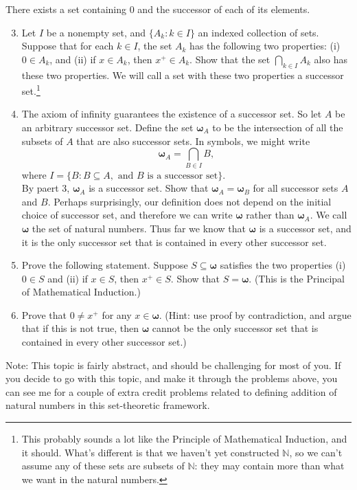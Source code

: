 \documentclass[letterpaper,12pt]{article}
\theoremstyle{definition}
\newcommand{\bomega}{\boldsymbol{\omega}}
\begin{document}
 There exists a set containing 0 and the successor of each of its elements.
\begin{enumerate}\setcounter{enumi}{2}
 \item Let $I$ be a nonempty set, and $\{A_k : k\in I\}$ an indexed collection of sets. Suppose that for each $k\in I$, the set $A_k$ has the following two properties: (i) $0\in A_k$, and (ii) if $x\in A_k$, then $x^+\in A_k$. Show that the set $\bigcap_{k\in I}A_k$ also has these two properties. We will call a set with these two properties a successor set.\footnote{This probably sounds a lot like the Principle of Mathematical Induction, and it should. What's different is that we haven't yet constructed $\mathbb{N}$, so we can't assume any of these sets are subsets of $\mathbb{N}$: they may contain more than what we want in the natural numbers.}
 \item The axiom of infinity guarantees the existence of a successor set. So let $A$ be an arbitrary successor set. Define the set $\bomega_A$ to be the intersection of all the subsets of $A$ that are also successor sets. In symbols, we might write
\[
 \bomega_A = \bigcap_{B\in I}B,
\]
where $I=\{B : B\subseteq A, \text{ and } B \text{ is a successor set}\}$.\\
By paert 3, $\bomega_A$ is a successor set. Show that $\bomega_A=\bomega_B$ for all successor sets $A$ and $B$. Perhaps surprisingly, our definition does not depend on the initial choice of successor set, and therefore we can write $\bomega$ rather than $\bomega_A$. We call $\bomega$ the set of natural numbers. Thus far we know that $\bomega$ is a successor set, and it is the only successor set that is contained in every other successor set.
\item Prove the following statement. Suppose $S\subseteq \bomega$ satisfies the two properties (i) $0\in S$ and (ii) if $x\in S$, then $x^+\in S$. Show that $S=\bomega$. (This is the Principal of Mathematical Induction.)
\item Prove that $0\neq x^+$ for any $x\in\bomega$. (Hint: use proof by contradiction, and argue that if this is not true, then $\bomega$ cannot be the only successor set that is contained in every other successor set.)
\end{enumerate}
Note: This topic is fairly abstract, and should be challenging for most of you. If you decide to go with this topic, and make it through the problems above, you can see me for a couple of extra credit problems related to defining addition of natural numbers in this set-theoretic framework.
\end{document}
